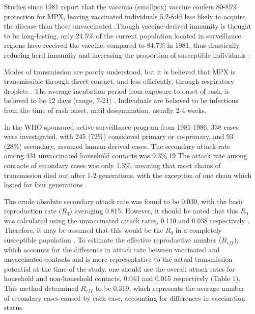Studies since 1981 report that the vaccinia (smallpox) vaccine confers 80-85\% protection for MPX, leaving vaccinated individuals 5.2-fold less likely to acquire the disease than those unvaccinated \cite{Fine1988, Rimoin2010}.Though vaccine-derived immunity is thought to be long-lasting, only 24.5\% of the current population located in surveillance regions have received the vaccine, compared to 84.7\% in 1981, thus drastically reducing herd immunity and increasing the proportion of susceptible individuals \cite{Rimoin2010, Jezek1988, Jezek1987}.

Modes of transmission are poorly understood, but it is believed that MPX is transmissible through direct contact, and less efficiently, through respiratory droplets \cite{DiGiulio2004}. The average incubation period from exposure to onset of rash, is believed to be 12 days (range, 7-21) \cite{Jezek1987, Hutin2001}. Individuals are believed to be infectious from the time of rash onset, until desquamation, usually 2-4 weeks. 

In the WHO sponsored active surveillance program from 1981-1986, 338 cases were investigated, with 245 (72\%) considered primary or co-primary, and 93 (28\%) secondary, assumed human-derived cases. The secondary attack rate among 431 unvaccinated household contacts was 9.3\%.19 The attack rate among contacts of secondary cases was only 1.3\%, meaning that most chains of transmission died out after 1-2 generations, with the exception of one chain which lasted for four generations \cite{Jezek1986}.

The crude absolute  secondary attack rate was found to be 0.030, with the basic reproduction rate ($R_{0}$) averaging 0.815. However, it should be noted that this $R_{0}$ was calculated using the unvaccinated attack rates, 0.110 and 0.038 respectively \cite{Fine1988}. Therefore, it may be assumed that this would be the $R_{0}$ in a completely susceptible population \cite{Blumberg2014}. To estimate the effective reproductive number ($R_{eff}$), which accounts for the difference in attack rate between vaccinated and unvaccinated contacts and is more representative to the actual transmission potential at the time of the study, one should use the overall attack rates for household and non-household contacts, 0.043 and 0.015 respectively (Table 1). This method determined $R_{eff}$ to be 0.319, which represents the average number of secondary cases caused by each case, accounting for differences in vaccination status. 

